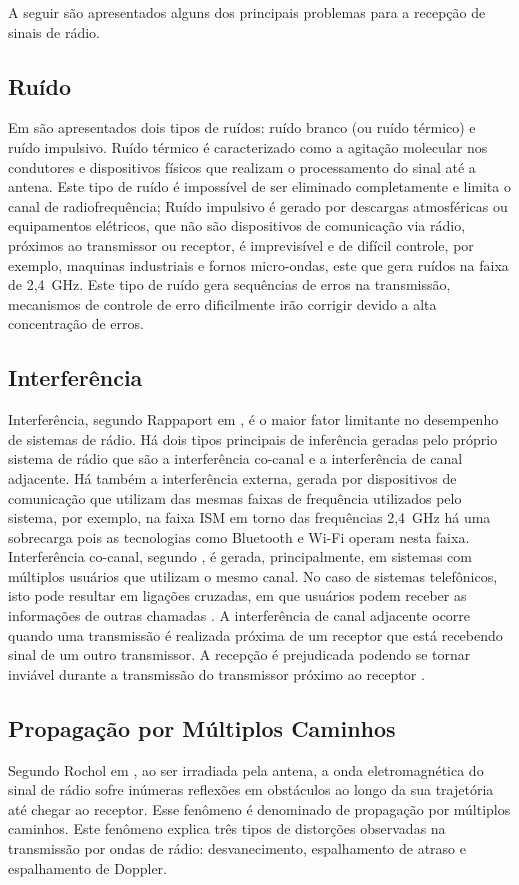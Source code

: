A seguir são apresentados alguns dos principais problemas para a recepção de sinais de rádio.

\subsection{Ruído}
Em \cite{rochol2018sistemas} são apresentados dois tipos de ruídos: ruído branco (ou ruído térmico) e ruído impulsivo. Ruído térmico é caracterizado como a agitação molecular nos condutores e dispositivos físicos que realizam o processamento do sinal até a antena. Este tipo de ruído é impossível de ser eliminado completamente e limita o canal de radiofrequência; Ruído impulsivo é gerado por descargas atmosféricas ou equipamentos elétricos, que não são dispositivos de comunicação via rádio, próximos ao transmissor ou receptor, é imprevisível e de difícil controle, por exemplo, maquinas industriais e fornos micro-ondas, este que gera ruídos na faixa de 2,4~GHz. Este tipo de ruído gera sequências de erros na transmissão, mecanismos de controle de erro dificilmente irão corrigir devido a alta concentração de erros.

\subsection{Interferência}
Interferência, segundo Rappaport em \cite{rappaport2009}, é o maior fator limitante no desempenho de sistemas de rádio. Há dois tipos principais de inferência geradas pelo próprio sistema de rádio que são a interferência co-canal e a interferência de canal adjacente. Há também a interferência externa, gerada por dispositivos de comunicação que utilizam das mesmas faixas de frequência utilizados pelo sistema, por exemplo, na faixa ISM em torno das frequências 2,4~GHz há uma sobrecarga pois as tecnologias como Bluetooth e Wi-Fi operam nesta faixa. Interferência co-canal, segundo \cite{rochol2018sistemas}, é gerada, principalmente, em sistemas com múltiplos usuários que utilizam o mesmo canal. No caso de sistemas telefônicos, isto pode resultar em ligações cruzadas, em que usuários podem receber as informações de outras chamadas \cite{rappaport2009}. A interferência de canal adjacente ocorre quando uma transmissão é realizada próxima de um receptor que está recebendo sinal de um outro transmissor. A recepção é prejudicada podendo se tornar inviável durante a transmissão do transmissor próximo ao receptor \cite{rappaport2009}.


\subsection{Propagação por Múltiplos Caminhos}
Segundo Rochol em \cite{rochol2018sistemas}, ao ser irradiada pela antena, a onda eletromagnética do sinal de rádio sofre inúmeras reflexões em obstáculos ao longo da sua trajetória até chegar ao receptor. Esse fenômeno é denominado de propagação por múltiplos caminhos. Este fenômeno explica três tipos de distorções observadas na transmissão por ondas de rádio: desvanecimento, espalhamento de atraso e espalhamento de Doppler.

